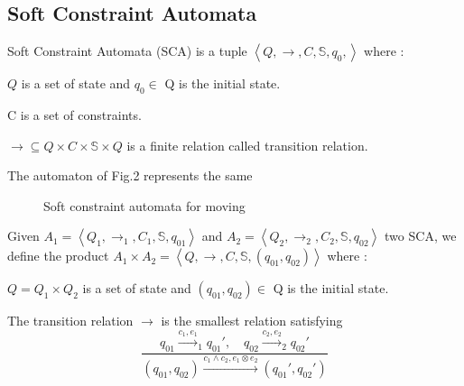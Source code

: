 \subsection{Soft Constraint Automata}

\begin{definition}
	Soft Constraint Automata (SCA) is a tuple $\left\langle Q, \rightarrow, C, \mathbb{S}, q_{0}, \right\rangle$ where : 
	\begin{list}{-}{ }
		\item $Q$ is a set of state and $q_0\in$ Q is the initial state.
		\item C is a set of constraints.
		\item $\rightarrow \subseteq Q \times C \times \mathbb{S} \times Q$ is a finite relation called transition relation. 
	\end{list}
\end{definition}

\begin{example}
	The automaton of Fig.2 represents the same 
	\begin{figure}[H]
		\centering
		\resizebox{8cm}{!}{}
		\caption{Soft constraint automata for moving}
		\label{moveSCA}
	\end{figure}
\end{example}


\begin{definition}
	Given $A_1=\left\langle Q_1, \rightarrow_1, C_1,\mathbb{S}, q_{01} \right\rangle$ and $A_2=\left\langle Q_2, \rightarrow_2, C_2,\mathbb{S}, q_{02} \right\rangle$ two SCA, we define the product $ A_1 \times A_2 = \left \langle Q, \rightarrow, C,\mathbb{S}, (q_{01},q_{02}) \right \rangle$ where : 
	\begin{list}{-}{ }
		\item $Q= Q_1 \times Q_2 $ is a set of state and $(q_{01},q_{02})\in$ Q is the initial state.
		\item The transition relation $\rightarrow$ is the smallest relation satisfying
		$$
		\frac{q_{01} \xrightarrow{c_1,e_1}_1 q_{01}' ,\quad q_{02} \xrightarrow{c_2,e_2}_2 q_{02}' }{(q_{01},q_{02}) \xrightarrow{c_1 \land c_2,e_1 \otimes e_2}(q_{01}',q_{02}')}
		$$
	\end{list}
\end{definition}
